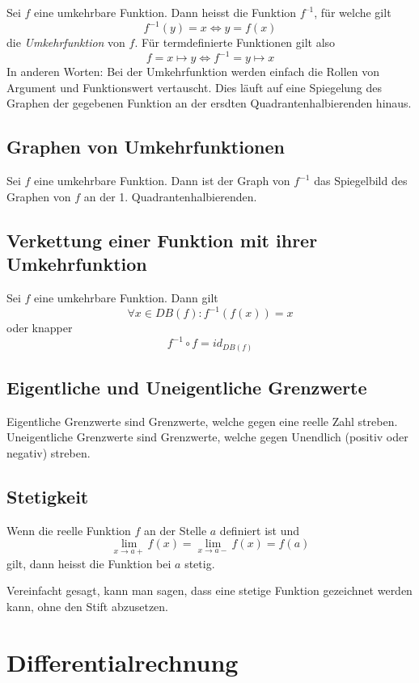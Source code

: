 \documentclass[10pt,a4paper]{article}
\begin{document}
Sei $f$ eine umkehrbare Funktion. Dann heisst die Funktion $f^{–1}$, für welche gilt
$$f^{-1}(y) = x \Leftrightarrow y = f(x)$$
die \textit{Umkehrfunktion} von $f$. Für termdefinierte Funktionen gilt also
$$f = x \mapsto y \Leftrightarrow f^{-1} = y \mapsto x$$
In anderen Worten: Bei der Umkehrfunktion werden einfach die Rollen von Argument und Funktionswert vertauscht. Dies läuft auf eine Spiegelung des Graphen der gegebenen Funktion an der ersdten Quadrantenhalbierenden hinaus.


\subsection{Graphen von Umkehrfunktionen}

Sei $f$ eine umkehrbare Funktion. Dann ist der Graph von $f^{-1}$ das Spiegelbild des Graphen von $f$ an der 1. Quadrantenhalbierenden.


\subsection{Verkettung einer Funktion mit ihrer Umkehrfunktion}

Sei $f$ eine umkehrbare Funktion. Dann gilt
$$\forall x \in DB(f): f^{-1}(f(x)) = x$$
oder knapper
$$f^{-1} \circ f = id_{DB(f)}$$

\subsection{Eigentliche und Uneigentliche Grenzwerte}

Eigentliche Grenzwerte sind Grenzwerte, welche gegen eine reelle Zahl streben. Uneigentliche Grenzwerte sind Grenzwerte, welche gegen Unendlich (positiv oder negativ) streben.

\subsection{Stetigkeit}

Wenn die reelle Funktion $f$ an der Stelle $a$ definiert ist und
$$\lim_{x \to a+} f(x) = \lim_{x \to a-} f(x) = f(a)$$
gilt, dann heisst die Funktion bei $a$ stetig.

Vereinfacht gesagt, kann man sagen, dass eine stetige Funktion gezeichnet werden kann, ohne den Stift abzusetzen.



\section{Differentialrechnung}
\end{document}
